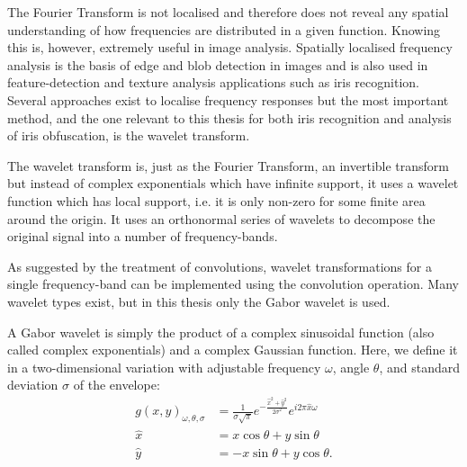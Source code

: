 The Fourier Transform is not localised and therefore does not reveal any spatial understanding of how frequencies are distributed in a given function. Knowing this is, however, extremely useful in image analysis. Spatially localised frequency analysis is the basis of edge and blob detection in images and is also used in feature-detection and texture analysis applications such as iris recognition. Several approaches exist to localise frequency responses but the most important method, and the one relevant to this thesis for both iris recognition and analysis of iris obfuscation, is the wavelet transform.

The wavelet transform is, just as the Fourier Transform, an invertible transform but instead of complex exponentials which have infinite support, it uses a wavelet function which has local support, i.e. it is only non-zero for some finite area around the origin. It uses an orthonormal series of wavelets to decompose the original signal into a number of frequency-bands.

As suggested by the treatment of convolutions, wavelet transformations for a single frequency-band can be implemented using the convolution operation. Many wavelet types exist, but in this thesis only the Gabor wavelet is used.



A Gabor wavelet is simply the product of a complex sinusoidal function (also called complex exponentials) and a complex Gaussian function. Here, we define it in a two-dimensional variation with adjustable frequency $\omega$, angle $\theta$, and standard deviation $\sigma$ of the envelope:
\begin{align}
    g(x,y)_{\omega, \theta, \sigma} &= \frac{1}{\sigma\sqrt{\pi}} e^{-\frac{\hat{x}^2+\hat{y}^2}{2\sigma^2}} e^{i 2\pi \hat{x}\omega}\\
    \hat{x} &= x\cos\theta + y\sin\theta \\
    \hat{y} &= -x\sin\theta + y\cos\theta.
\end{align}



























